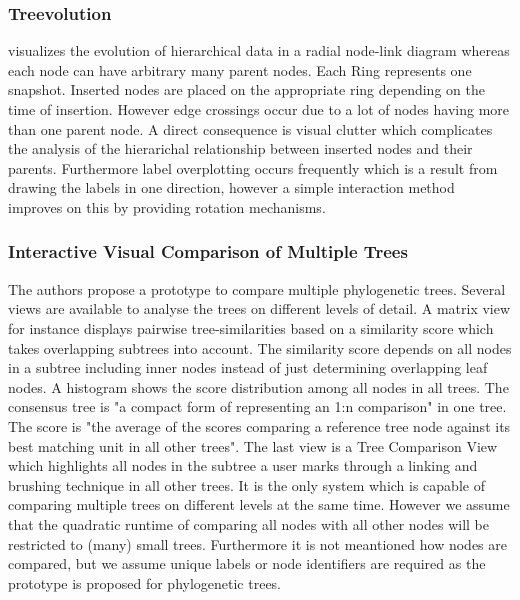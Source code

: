 \subsubsection{Treevolution\cite{theron2006hierarchical}} visualizes the evolution of hierarchical data in a radial node-link diagram whereas each node can have arbitrary many parent nodes. Each Ring represents one snapshot. Inserted nodes are placed on the appropriate ring depending on the time of insertion. However edge crossings occur due to a lot of nodes having more than one parent node. A direct consequence is visual clutter which complicates the analysis of the hierarichal relationship between inserted nodes and their parents. Furthermore label overplotting occurs frequently which is a result from drawing the labels in one direction, however a simple interaction method improves on this by providing rotation mechanisms.

\subsubsection{Interactive Visual Comparison of Multiple Trees\cite{bremm2011interactive}} The authors propose a prototype to compare multiple phylogenetic trees. Several views are available to analyse the trees on different levels of detail. A matrix view for instance displays pairwise tree-similarities based on a similarity score which takes overlapping subtrees into account. The similarity score depends on all nodes in a subtree including inner nodes instead of just determining overlapping leaf nodes. A histogram shows the score distribution among all nodes in all trees. The consensus tree is "a compact form of representing an 1:n comparison" in one tree. The score is "the average of the scores comparing a reference tree node against its best matching unit in all other trees". The last view is a Tree Comparison View which highlights all nodes in the subtree a user marks through a linking and brushing technique in all other trees. It is the only system which is capable of comparing multiple trees on different levels at the same time. However we assume that the quadratic runtime of comparing all nodes with all other nodes will be restricted to (many) small trees. Furthermore it is not meantioned how nodes are compared, but we assume unique labels or node identifiers are required as the prototype is proposed for phylogenetic trees. 

